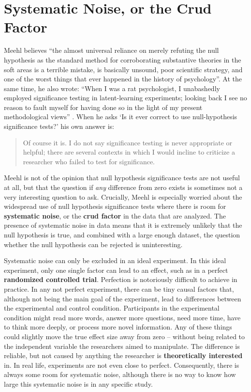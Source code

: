 \documentclass[
  oneside]{book}
\begin{document}
\hypertarget{crud}{%
\section{Systematic Noise, or the Crud Factor}\label{crud}}

Meehl \citeyearpar{meehl_theoretical_1978} believes ``the almost universal reliance on merely refuting the null hypothesis as the standard method for corroborating substantive theories in the soft areas is a terrible mistake, is basically unsound, poor scientific strategy, and one of the worst things that ever happened in the history of psychology''. At the same time, he also wrote: ``When I was a rat psychologist, I unabashedly employed significance testing in latent-learning experiments; looking back I see no reason to fault myself for having done so in the light of my present methodological views'' \citep{meehl_appraising_1990}. When he asks `Is it ever correct to use null-hypothesis significance tests?' his own answer is:

\begin{quote}
Of course it is. I do not say significance testing is never appropriate or helpful; there are several contexts in which I would incline to criticize a researcher who failed to test for significance.
\end{quote}

Meehl is not of the opinion that null hypothesis significance tests are not useful at all, but that the question if \emph{any} difference from zero exists is sometimes not a very interesting question to ask. Crucially, Meehl is especially worried about the widespread use of null hypothesis significance tests where there is room for \textbf{systematic noise}, or the \textbf{crud factor} in the data that are analyzed. The presence of systematic noise in data means that it is extremely unlikely that the null hypothesis is true, and combined with a large enough dataset, the question whether the null hypothesis can be rejected is uninteresting.

Systematic noise can only be excluded in an ideal experiment. In this ideal experiment, only one single factor can lead to an effect, such as in a perfect \textbf{randomized controlled trial}. Perfection is notoriously difficult to achieve in practice. In any not perfect experiment, there can be tiny causal factors that, although not being the main goal of the experiment, lead to differences between the experimental and control condition. Participants in the experimental condition might read more words, answer more questions, need more time, have to think more deeply, or process more novel information. Any of these things could slightly move the true effect size away from zero -- without being related to the independent variable the researchers aimed to manipulate. The difference is reliable, but not caused by anything the researcher is \textbf{theoretically interested} in. In real life, experiments are not even close to perfect. Consequently, there is always some room for systematic noise, although there is no way to know how large this systematic noise is in any specific study.
\end{document}
